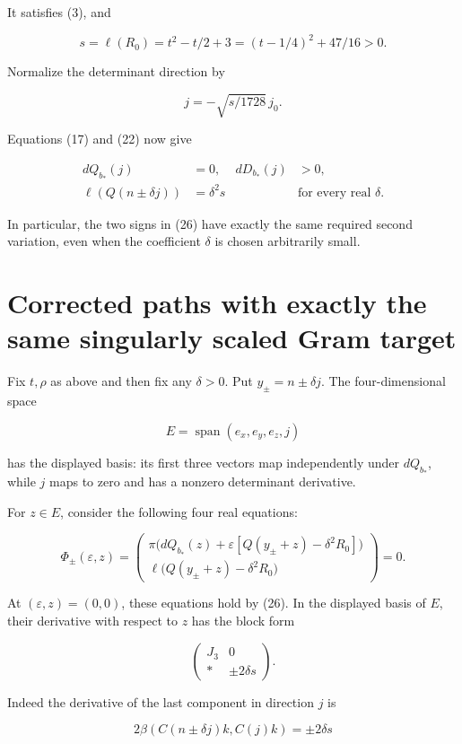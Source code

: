 \documentclass[11pt]{article}
\begin{document}
It satisfies (3), and

\[
s=\ell(R_0)=t^2-t/2+3=(t-1/4)^2+47/16>0.
\]

Normalize the determinant direction by

\[
j=-\sqrt{s/1728}\,j_0.
\tag{25}
\]

Equations (17) and (22) now give

\[
\begin{aligned}
dQ_{b_*}(j)&=0,&dD_{b_*}(j)&>0,\\
\ell(Q(n\pm\delta j))&=\delta^2s
&&\text{for every real }\delta.
\end{aligned}
\tag{26}
\]

In particular, the two signs in (26) have exactly the same required second
variation, even when the coefficient \(\delta\) is chosen arbitrarily small.

\section{Corrected paths with exactly the same singularly scaled Gram target}

Fix \(t,\rho\) as above and then fix any \(\delta>0\). Put
\(y_\pm=n\pm\delta j\). The four-dimensional space

\[
E=\operatorname{span}(e_x,e_y,e_z,j)
\]

has the displayed basis: its first three vectors map independently under
\(dQ_{b_*}\), while \(j\) maps to zero and has a nonzero determinant
derivative.

For \(z\in E\), consider the following four real equations:

\[
\Phi_\pm(\varepsilon,z)=
\begin{pmatrix}
\pi\bigl(dQ_{b_*}(z)+\varepsilon[Q(y_\pm+z)-\delta^2R_0]\bigr)\\
\ell\bigl(Q(y_\pm+z)-\delta^2R_0\bigr)
\end{pmatrix}=0.
\tag{27}
\]

At \((\varepsilon,z)=(0,0)\), these equations hold by (26). In the displayed
basis of \(E\), their derivative with respect to \(z\) has the block form

\[
\begin{pmatrix}
J_3&0\\
*&\pm2\delta s
\end{pmatrix}.
\tag{28}
\]

Indeed the derivative of the last component in direction \(j\) is

\[
2\beta(C(n\pm\delta j)k,C(j)k)=\pm2\delta s
\]
\end{document}
